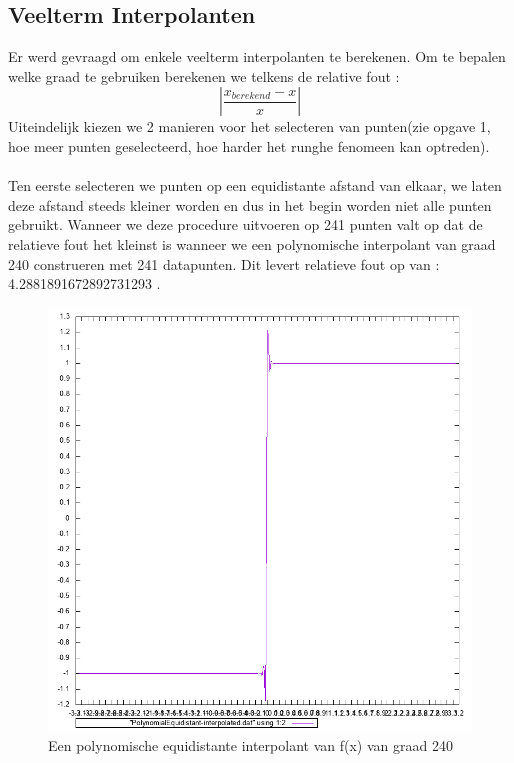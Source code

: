 \documentclass[10pt,a4paper]{article}
\begin{document}
\subsection{Veelterm Interpolanten}
Er werd gevraagd om enkele veelterm interpolanten te berekenen. Om te bepalen welke graad te gebruiken berekenen we telkens de relative fout : 
$$ \left | \frac{x_{berekend} - x}{x}  \right |$$
Uiteindelijk kiezen we 2 manieren voor het selecteren van punten(zie opgave 1, hoe meer punten geselecteerd, hoe harder het runghe fenomeen kan optreden).
\\
\\ 
Ten eerste selecteren we punten op een equidistante afstand van elkaar, we laten deze afstand steeds kleiner worden en dus in het begin worden niet alle punten gebruikt. Wanneer we deze procedure uitvoeren op 241 punten valt op dat de relatieve fout het kleinst is wanneer we een polynomische interpolant van graad 240 construeren met 241 datapunten. Dit levert relatieve fout op van : 4.2881891672892731293 . 
\begin{figure}[H]
\centering
\includegraphics[scale=0.3]{../Twographs/PolynomialEquidistant-interpolated}
\caption{Een polynomische equidistante interpolant van f(x) van graad 240}
\end{figure}
\begin{figure}[H]
\end{figure}
\end{document}
